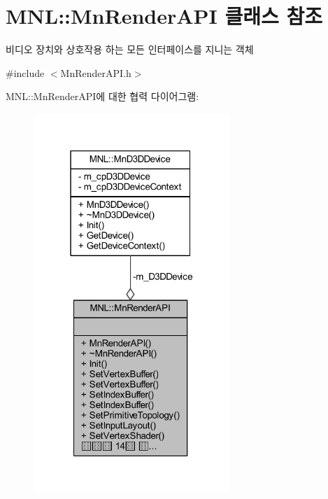 \hypertarget{class_m_n_l_1_1_mn_render_a_p_i}{}\section{M\+NL\+:\+:Mn\+Render\+A\+PI 클래스 참조}
\label{class_m_n_l_1_1_mn_render_a_p_i}


비디오 장치와 상호작용 하는 모든 인터페이스를 지니는 객체  




{\ttfamily \#include $<$Mn\+Render\+A\+P\+I.\+h$>$}



M\+NL\+:\+:Mn\+Render\+A\+P\+I에 대한 협력 다이어그램\+:
\nopagebreak
\begin{figure}[H]
\begin{center}
\leavevmode
\includegraphics[width=211pt]{class_m_n_l_1_1_mn_render_a_p_i__coll__graph}
\end{center}
\end{figure}
